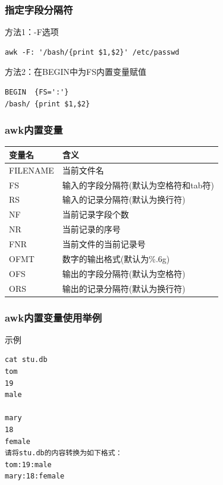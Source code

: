 \documentclass[xcolor=svgnames,presentation]{beamer}
\begin{document}
\begin{frame}[fragile]
\frametitle{指定字段分隔符}
\label{sec-2-2-25}
\begin{exampleblock}{方法1：-F选项}
\label{sec-2-2-25-1}


\begin{verbatim}
awk -F: '/bash/{print $1,$2}' /etc/passwd
\end{verbatim}
\end{exampleblock}
\begin{block}{方法2：在BEGIN中为FS内置变量赋值}
\label{sec-2-2-25-2}


\begin{verbatim}
BEGIN  {FS=':'}
/bash/ {print $1,$2}
\end{verbatim}
\end{block}
\end{frame}
\begin{frame}
\frametitle{awk内置变量}
\label{sec-2-2-26}


\begin{center}
\begin{tabular}{ll}
 变量名    &  含义                                   \\
\hline
 FILENAME  &  当前文件名                             \\
 FS        &  输入的字段分隔符(默认为空格符和tab符)  \\
 RS        &  输入的记录分隔符(默认为换行符)         \\
 NF        &  当前记录字段个数                       \\
 NR        &  当前记录的序号                         \\
 FNR       &  当前文件的当前记录号                   \\
 OFMT      &  数字的输出格式(默认为\%.6g)            \\
 OFS       &  输出的字段分隔符(默认为空格符)         \\
 ORS       &  输出的记录分隔符(默认为换行符)         \\
\end{tabular}
\end{center}
\end{frame}
\begin{frame}[fragile]
\frametitle{awk内置变量使用举例}
\label{sec-2-2-27}
\begin{exampleblock}{示例}
\label{sec-2-2-27-1}


\begin{verbatim}
cat stu.db
tom
19
male

mary
18
female
请将stu.db的内容转换为如下格式：
tom:19:male
mary:18:female
\end{verbatim}
\end{exampleblock}
\end{frame}
\end{document}
